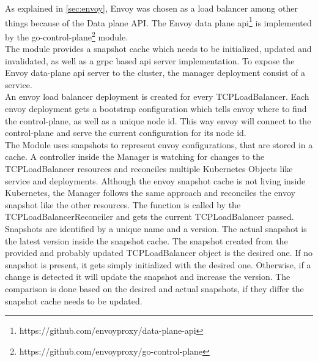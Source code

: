 As explained in \autoref{sec:envoy}, Envoy was chosen as a load balancer among other things because of the Data plane API.
The Envoy data plane api\footnote{https://github.com/envoyproxy/data-plane-api} is implemented by the go-control-plane\footnote{https://github.com/envoyproxy/go-control-plane} module.
\\
The module provides a snapshot cache which needs to be initialized, updated and invalidated, as well as a grpc based api server implementation.
To expose the Envoy data-plane api server to the cluster, the manager deployment consist of a service.
\\
An envoy load balancer deployment is created for every TCPLoadBalancer.
Each envoy deployment gets a bootstrap configuration which tells envoy where to find the control-plane, as well as a unique node id.
This way envoy will connect to the control-plane and serve the current configuration for its node id.
\\
The Module uses snapshots to represent envoy configurations, that are stored in a cache.
A controller inside the Manager is watching for changes to the TCPLoadBalancer resources and reconciles multiple Kubernetes Objects like service and deployments.
Although the envoy snapshot cache is not living inside Kubernetes, the Manager follows the same approach and reconciles the envoy snapshot like the other resources.
The function is called by the TCPLoadBalancerReconciler and gets the current TCPLoadBalancer passed.
Snapshots are identified by a unique name and a version.
The actual snapshot is the latest version inside the snapshot cache.
The snapshot created from the provided and probably updated TCPLoadBalancer object is the desired one.
If no snapshot is present, it gets simply initialized with the desired one.
Otherwise, if a change is detected it will update the snapshot and increase the version.
The comparison is done based on the desired and actual snapshots, if they differ the snapshot cache needs to be updated.
\\

